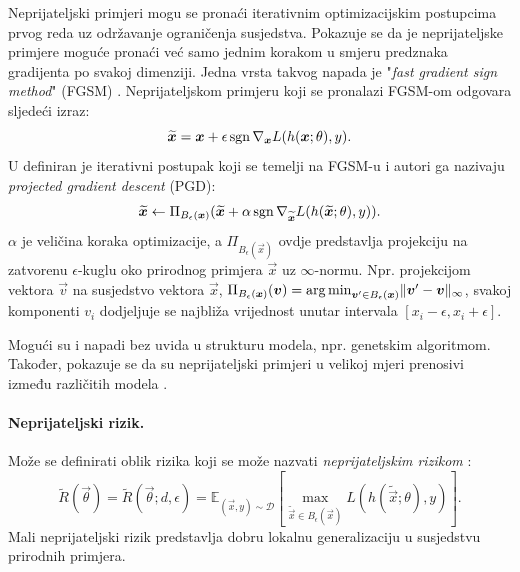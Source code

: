 \documentclass[utf8, seminar, numeric, lmodern]{feri}
\begin{document}
Neprijateljski primjeri mogu se pronaći iterativnim optimizacijskim postupcima prvog reda uz održavanje ograničenja susjedstva. Pokazuje se da je neprijateljske primjere moguće pronaći već samo jednim korakom u smjeru predznaka gradijenta po svakoj dimenziji. Jedna vrsta takvog napada je "\emph{fast gradient sign method}" (FGSM) \cite{goodfellow14-ehae}. Neprijateljskom primjeru koji se pronalazi FGSM-om odgovara sljedeći izraz:
\begin{equation}
\widetilde{\bm{x}} = \bm{x} + \epsilon\operatorname{sgn} \nabla_{\bm{x}} L(h(\bm{x}; \theta), y).
\end{equation}
U \cite{madry17-tdlmraa} definiran je iterativni postupak koji se temelji na FGSM-u i autori ga nazivaju \emph{projected gradient descent} (PGD):
\begin{equation} \label{eq:pgd}
\widetilde{\bm{x}} \gets \Pi_{B_\epsilon(\bm{x})} (\widetilde{\bm{x}} + \alpha\operatorname{sgn}\nabla_{\widetilde{\bm{x}}} L(h(\widetilde{\bm{x}}; \theta), y)).
\end{equation}
$\alpha$ je veličina koraka optimizacije, a $\Pi_{B_\epsilon(\vec x)}$ ovdje predstavlja projekciju na zatvorenu $\epsilon$-kuglu oko prirodnog primjera $\vec x$ uz $\infty$-normu. Npr. projekcijom vektora $\vec v$ na susjedstvo vektora $\vec x$, $\Pi_{B_\epsilon(\bm{x})}(\bm{v}) = \operatorname*{arg\,min}_{\bm{v}'\in B_\epsilon(\bm{x})}\lVert \bm{v}'-\bm{v}\rVert_\infty$, svakoj komponenti $v_i$ dodjeljuje se najbliža vrijednost unutar intervala $\left[x_i-\epsilon, x_i+\epsilon\right]$.

Mogući su i napadi bez uvida u strukturu modela, npr. genetskim algoritmom. Također, pokazuje se da su neprijateljski primjeri u velikoj mjeri prenosivi između različitih modela \cite{szegedy13-intrig-ipnn, goodfellow14-ehae, liu-dtaeba}.

\paragraph{Neprijateljski rizik.} Može se definirati oblik rizika koji se može nazvati \emph{neprijateljskim rizikom} \cite{madry17-tdlmraa}:
\begin{equation}\label{eq:adv-risk}
\widetilde{R}(\vec\theta) = \widetilde{R}(\vec\theta;d,\epsilon) = \mathbb{E}_{(\vec x,y)\sim\mathcal{D}}\left[
\max_{\widetilde{\vec x} \in B_\epsilon(\vec x)} L(h(\widetilde{\vec x}; \theta), y) \right].
\end{equation}
Mali neprijateljski rizik predstavlja dobru lokalnu generalizaciju u susjedstvu prirodnih primjera.
\end{document}
